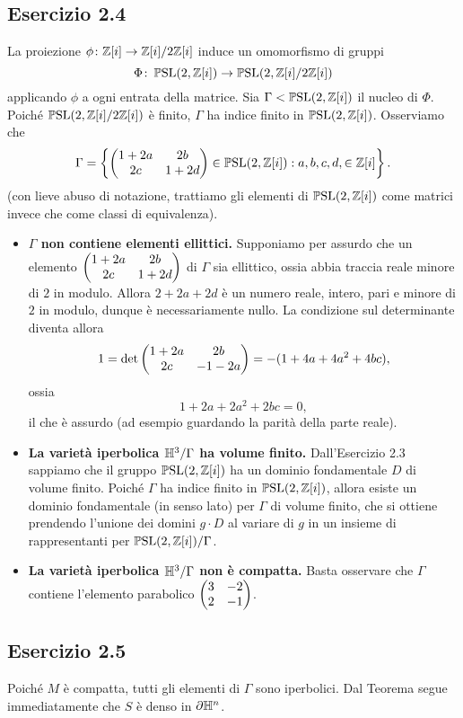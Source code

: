 \subsection*{Esercizio 2.4}
La proiezione $\phi\colon\mathbb{Z}[i]\to\mathbb{Z}[i]/2\mathbb{Z}[i]$ induce un omomorfismo di gruppi
\[
\Phi\colon\operatorname{\mathbb{P}SL}(2,\mathbb{Z}[i])\to\operatorname{\mathbb{P}SL}(2,\mathbb{Z}[i]/2\mathbb{Z}[i])
\]
applicando $\phi$ a ogni entrata della matrice. Sia $\Gamma<\operatorname{\mathbb{P}SL}(2,\mathbb{Z}[i])$ il nucleo di $\Phi$. Poiché $\operatorname{\mathbb{P}SL}(2,\mathbb{Z}[i]/2\mathbb{Z}[i])$ è finito, $\Gamma$ ha indice finito in $\operatorname{\mathbb{P}SL}(2,\mathbb{Z}[i])$. Osserviamo che
\[
\Gamma=\left\{\begin{pmatrix}1+2a&2b\\2c&1+2d\end{pmatrix}\in\operatorname{\mathbb{P}SL}(2,\mathbb{Z}[i]):a,b,c,d,\in\mathbb{Z}[i]\right\}.
\]
(con lieve abuso di notazione, trattiamo gli elementi di $\operatorname{\mathbb{P}SL}(2,\mathbb{Z}[i])$ come matrici invece che come classi di equivalenza).
\begin{itemize}
\item\textbf{$\Gamma$ non contiene elementi ellittici.} Supponiamo per assurdo che un elemento $\begin{pmatrix}1+2a&2b\\2c&1+2d\end{pmatrix}$ di $\Gamma$ sia ellittico, ossia abbia traccia reale minore di $2$ in modulo. Allora $2+2a+2d$ è un numero reale, intero, pari e minore di $2$ in modulo, dunque è necessariamente nullo. La condizione sul determinante diventa allora
\[
1=\det\begin{pmatrix}1+2a&2b\\2c&-1-2a\end{pmatrix}=-(1+4a+4a^2+4bc),
\]
ossia
\[
1+2a+2a^2+2bc=0,
\]
il che è assurdo (ad esempio guardando la parità della parte reale).
\item \textbf{La varietà iperbolica $\mathbb{H}^3/\Gamma$ ha volume finito.} Dall'Esercizio 2.3 sappiamo che il gruppo $\operatorname{\mathbb{P}SL}(2,\mathbb{Z}[i])$ ha un dominio fondamentale $D$ di volume finito. Poiché $\Gamma$ ha indice finito in $\operatorname{\mathbb{P}SL}(2,\mathbb{Z}[i])$, allora esiste un dominio fondamentale (in senso lato) per $\Gamma$ di volume finito, che si ottiene prendendo l'unione dei domini $g\cdot D$ al variare di $g$ in un insieme di rappresentanti per $\operatorname{\mathbb{P}SL}(2,\mathbb{Z}[i])/\Gamma$.
\item\textbf{La varietà iperbolica $\mathbb{H}^3/\Gamma$ non è compatta.} Basta osservare che $\Gamma$ contiene l'elemento parabolico $\begin{pmatrix}3&-2\\2&-1\end{pmatrix}$.
\end{itemize}

\subsection*{Esercizio 2.5}
Poiché $M$ è compatta, tutti gli elementi di $\Gamma$ sono iperbolici. Dal Teorema segue immediatamente che $S$ è denso in $\partial\mathbb{H}^n$.
